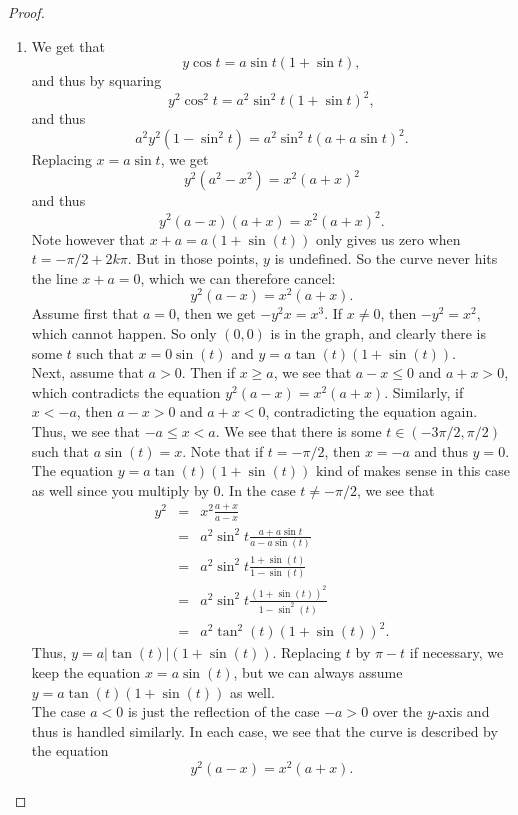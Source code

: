 \begin{proof}
    \begin{enumerate}
        \item We get that
        $$y\cos t = a\sin t (1 + \sin t),$$
        and thus by squaring
        $$y^2 \cos^2 t = a^2 \sin^2 t ( 1  + \sin t)^2,$$
        and thus
        $$a^2 y^2 (1 - \sin^2 t) = a^2 \sin^2 t ( a + a\sin t)^2.$$
        Replacing $x=a\sin t$, we get
        $$y^2 (a^2 - x^2) = x^2 (a + x)^2$$
        and thus
        $$y^2 (a-x)(a+x) = x^2 (a+x)^2.$$
        Note however that $x+a = a(1 + \sin(t))$ only gives us zero when $t = -\pi/2 + 2k\pi$. But in those points, $y$ is undefined. So the curve never hits the line $x+a = 0$, which we can therefore cancel:
        $$y^2 (a-x) = x^2 (a+x).$$
        Assume first that $a=0$, then we get $-y^2 x = x^3$. If $x\neq 0$, then $-y^2 = x^2$, which cannot happen. So only $(0,0)$ is in the graph, and clearly there is some $t$ such that $x=0\sin(t)$ and $y = a\tan(t) (1 + \sin(t))$.\\

        Next, assume that $a>0$. Then if $x\geq a$, we see that $a-x\leq 0$ and $a+x>0$, which contradicts the equation $y^2 (a-x) = x^2 (a+x)$. Similarly, if $x<-a$, then $a-x>0$ and $a+x<0$, contradicting the equation again. Thus, we see that $-a\leq x<a$. We see that there is some $t\in (-3\pi/2,\pi/2)$ such that $a\sin(t) = x$. Note that if $t=-\pi/2$, then $x=-a$ and thus $y=0$. The equation $y = a\tan(t) (1+\sin(t))$ kind of makes sense in this case as well since you multiply by $0$. In the case $t\neq -\pi/2$, we see that
        \begin{eqnarray*}
            y^2
            & = & x^2\frac{a+x}{a-x}\\
            & = & a^2 \sin^2 t \frac{a + a\sin t}{a - a\sin(t)}\\
            & = & a^2 \sin^2 t \frac{1 + \sin(t)}{1 - \sin(t)}\\
            & = & a^2 \sin^2 t \frac{(1 + \sin(t))^2}{1 - \sin^2(t)}\\
            & = & a^2 \tan^2(t) (1 + \sin(t))^2.
        \end{eqnarray*}
        Thus, $y = a|\tan(t)|(1 + \sin(t))$. Replacing $t$ by $\pi - t$ if necessary, we keep the equation $x = a\sin(t)$, but we can always assume $y = a\tan(t)(1+\sin(t))$ as well.\\

        The case $a<0$ is just the reflection of the case $-a>0$ over the $y$-axis and thus is handled similarly. In each case, we see that the curve is described by the equation
        $$y^2 (a-x) = x^2 (a+x).$$    


\end{enumerate}
\end{proof}
